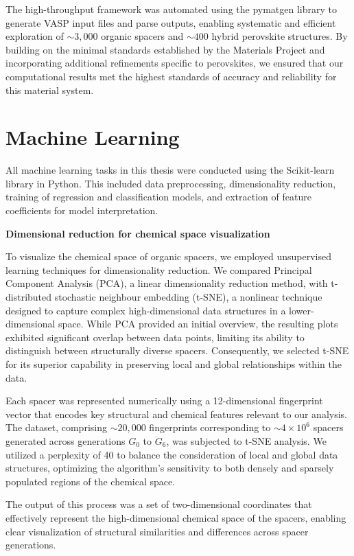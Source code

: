 The high-throughput framework was automated using the pymatgen library to generate VASP input files and parse outputs, enabling systematic and efficient exploration of $\sim3,000$ organic spacers and $\sim400$ hybrid perovskite structures. By building on the minimal standards established by the Materials Project and incorporating additional refinements specific to perovskites, we ensured that our computational results met the highest standards of accuracy and reliability for this material system.

\section{Machine Learning}\label{section:section3-4}

All machine learning tasks in this thesis were conducted using the Scikit-learn library in Python. This included data preprocessing, dimensionality reduction, training of regression and classification models, and extraction of feature coefficients for model interpretation.

\textbf{Dimensional reduction for chemical space visualization}

To visualize the chemical space of organic spacers, we employed unsupervised learning techniques for dimensionality reduction. We compared Principal Component Analysis (PCA), a linear dimensionality reduction method, with t-distributed stochastic neighbour embedding (t-SNE), a nonlinear technique designed to capture complex high-dimensional data structures in a lower-dimensional space. While PCA provided an initial overview, the resulting plots exhibited significant overlap between data points, limiting its ability to distinguish between structurally diverse spacers. Consequently, we selected t-SNE for its superior capability in preserving local and global relationships within the data.

Each spacer was represented numerically using a 12-dimensional fingerprint vector that encodes key structural and chemical features relevant to our analysis. The dataset, comprising $\sim20,000$ fingerprints corresponding to $\sim4\times10^6$ spacers generated across generations $G_0$ to $G_6$, was subjected to t-SNE analysis. We utilized a perplexity of 40 to balance the consideration of local and global data structures, optimizing the algorithm’s sensitivity to both densely and sparsely populated regions of the chemical space.

The output of this process was a set of two-dimensional coordinates that effectively represent the high-dimensional chemical space of the spacers, enabling clear visualization of structural similarities and differences across spacer generations.

